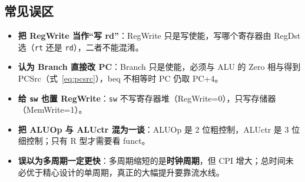 \subsection{常见误区}

\begin{itemize}
    \item \textbf{把 RegWrite 当作“写 rd”}：RegWrite 只是写使能，写哪个寄存器由 RegDst 选（\texttt{rt} 还是 \texttt{rd}），二者不能混淆。
    \item \textbf{认为 Branch 直接改 PC}：Branch 只是使能，必须与 ALU 的 Zero 相与得到 PCSrc（式~\ref{eq:pcsrc}），beq 不相等时 PC 仍取 PC+4。
    \item \textbf{给 \texttt{sw} 也置 RegWrite}：\texttt{sw} 不写寄存器堆（RegWrite=0），只写存储器（MemWrite=1）。
    \item \textbf{把 ALUOp 与 ALUctr 混为一谈}：ALUOp 是 2 位粗控制，ALUctr 是 3 位细控制；只有 R 型才需要看 funct。
    \item \textbf{误以为多周期一定更快}：多周期缩短的是\textbf{时钟周期}，但 CPI 增大；总时间未必优于精心设计的单周期，真正的大幅提升要靠流水线。
\end{itemize}

